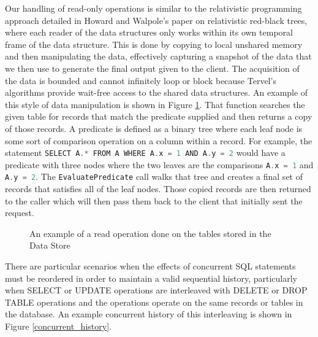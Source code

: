 \documentclass[conference, compsoc]{IEEEtran}
\let\oldReturn\Return
\renewcommand{\Return}{\State\oldReturn}
\newcommand{\inlinecode}[1]{\colorbox{codegrey}{\lstinline[language=C++]{#1}}}
\begin{document}
\par\vspace{\baselineskip}
Our handling of read-only operations is similar to the relativistic programming approach detailed 
in Howard and Walpole's paper on relativistic red-black trees, where each reader of the 
data structures only works within its own temporal frame of the data structure\cite{rbtree}. 
This is done by copying to local unshared memory and then manipulating the data, 
effectively capturing a snapshot of the data that we then use to generate the final 
output given to the client. The acquisition of the data is bounded and cannot 
infinitely loop or block because Tervel's algorithms provide wait-free access 
to the shared data structures. An example of this style of data manipulation is shown in 
Figure \ref{read_op}. That function searches the given table for records that match
the predicate supplied and then returns a copy of those records. A predicate is defined
as a binary tree where each leaf node is some sort of comparison operation on a column
within a record. For example, the statement \inlinecode{SELECT A.* FROM A WHERE A.x = 1 AND A.y = 2}
would have a predicate with three nodes where the two leaves are the comparisons
\inlinecode{A.x = 1} and \inlinecode{A.y = 2}. The \inlinecode{EvaluatePredicate} call
walks that tree and creates a final set of records that satisfies all of the
leaf nodes. Those copied records are then returned to the caller which will then
pass them back to the client that initially sent the request.

\begin{figure}[h]
 \begin{algorithmic}
  \EndFor
 \Else
 \EndIf
 \EndFunction
 \end{algorithmic}
 \caption{An example of a read operation done on the tables stored in the Data Store}
 \label{read_op}
\end{figure}

\par\vspace{\baselineskip}
There are particular scenarios when the effects of concurrent SQL statements must be reordered
in order to maintain a valid sequential history, particularly when SELECT or UPDATE operations
are interleaved with DELETE or DROP TABLE operations and the operations operate on the same 
records or tables in the database. An example concurrent history of this interleaving is shown in 
Figure \ref{concurrent_history}.
\end{document}

